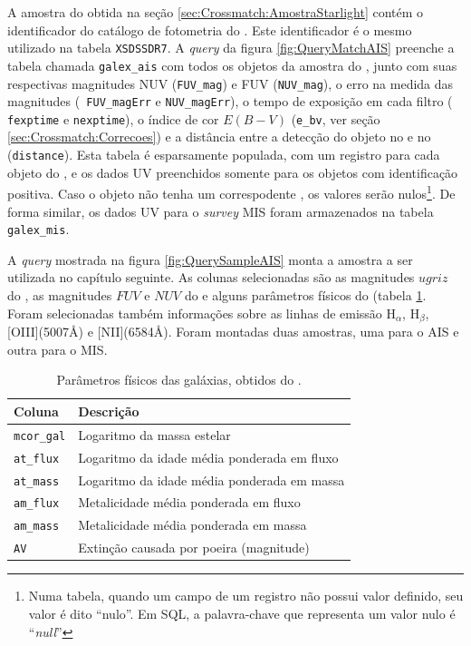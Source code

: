 A amostra do \starlight obtida na seção \ref{sec:Crossmatch:AmostraStarlight}
contém o identificador do catálogo de fotometria do \SDSS. Este identificador é
o mesmo utilizado na tabela {\tt XSDSSDR7}. A {\em query} da figura
\ref{fig:QueryMatchAIS} preenche a tabela chamada {\tt galex\_ais} com todos os
objetos da amostra do \starlight, junto com suas respectivas magnitudes NUV
({\tt FUV\_mag}) e FUV ({\tt NUV\_mag}), o erro na medida das magnitudes ({\tt
FUV\_magErr} e {\tt NUV\_magErr}), o tempo de exposição em cada filtro ({\tt
fexptime} e {\tt nexptime}), o índice de cor $E(B-V)$ ({\tt e\_bv}, ver seção
\ref{sec:Crossmatch:Correcoes}) e a distância entre a detecção do objeto
no \galex e no \SDSS ({\tt distance}). Esta tabela é esparsamente populada, com
um registro para cada objeto do \starlight, e os dados UV preenchidos somente
para os objetos com identificação positiva. Caso o objeto não tenha um
correspodente \galex, os valores serão nulos\footnote{Numa tabela, quando um
campo de um registro não possui valor definido, seu valor é dito ``nulo''. Em
SQL, a palavra-chave que representa um valor nulo é ``{\em null}''}. De forma
similar, os dados UV para o {\em survey} MIS foram armazenados na tabela {\tt
galex\_mis}.

A {\em query} mostrada na figura \ref{fig:QuerySampleAIS} monta a amostra a ser
utilizada no capítulo seguinte. As colunas selecionadas são as magnitudes
$ugriz$ do \SDSS, as magnitudes $FUV$ e $NUV$ do \galex e alguns parâmetros
físicos do \starlight (tabela \ref{tab:ParamFisicos}. Foram selecionadas também
informações sobre as linhas de emissão H$_\alpha$, H$_\beta$, [OIII](5007\AA) e
[NII](6584\AA). Foram montadas duas amostras, uma para o AIS e outra para o MIS.

\begin{table}
	\caption[Parâmetros físicos das galáxias utilizados na amostra.]
	{Parâmetros físicos das galáxias, obtidos do \starlight.}
	\begin{tabular}{l l}
		Coluna & Descrição \\
		\midrule
		{\tt mcor\_gal} & Logaritmo da massa estelar \\
		{\tt at\_flux}  & Logaritmo da idade média ponderada em fluxo \\
		{\tt at\_mass}  & Logaritmo da idade média ponderada em massa \\
		{\tt am\_flux}  & Metalicidade média ponderada em fluxo \\
		{\tt am\_mass}  & Metalicidade média ponderada em massa \\
		{\tt AV}       & Extinção causada por poeira (magnitude) \\
	\end{tabular}
	\label{tab:ParamFisicos}
\end{table}

